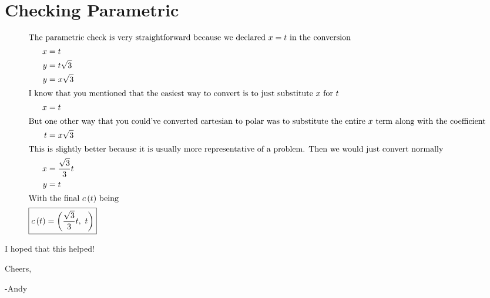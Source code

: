 \documentclass[12pt]{article}
\begin{document}
\section{Checking Parametric}
\begin{align*}
\intertext{The parametric check is very straightforward because we declared \(x=t\) in the conversion}
x&=t\\
y&=t\sqrt{3}\\
y&=x\sqrt{3}\\
\intertext{I know that you mentioned that the easiest way to convert is to just substitute \(x\) for \(t\)}
x&=t\\
\intertext{But one other way that you could've converted cartesian to polar was to substitute the entire \(x\) term along with the coefficient}
t&=x\sqrt{3}\\
\intertext{This is slightly better because it is usually more representative of a problem. Then we would just convert normally}
x&=\frac{\sqrt{3}}{3}t\\
y&=t\\
\intertext{With the final \(c\left(t\right)\) being}
\Aboxed{c\left(t\right)&=\left(\frac{\sqrt{3}}{3}t,\ t\right)}
\end{align*}

I hoped that this helped!

\bigskip
Cheers,

-Andy
\end{document}
